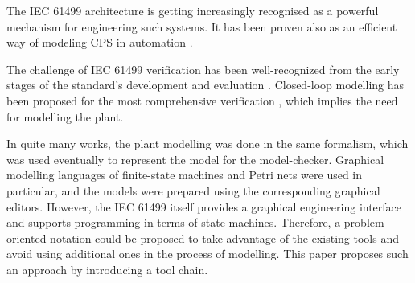 \documentclass[conference]{IEEEtran}
\begin{document}
The {IEC 61499} architecture \cite{iec61499part12012} is getting increasingly recognised as a powerful mechanism for engineering such systems. 
It has been proven also as an efficient way of modeling CPS in automation \cite{dai2017discrete}. 

The challenge of IEC 61499 verification has been well-recognized from the early stages of the standard's development and evaluation \cite{vyatkin1999modeling}. Closed-loop modelling has been proposed for the most comprehensive verification \cite{vyatkin2008closed}, which implies the need for modelling the plant. 

In quite many works, the plant modelling \cite{buzhinsky2016plant} was done in the same formalism, which was used eventually to represent the model for the model-checker. Graphical modelling languages of finite-state machines and Petri nets \cite{berthomieu1991modeling} were used in particular, and the models were prepared using the corresponding graphical editors.
However, the IEC 61499 itself provides a graphical engineering interface and supports programming in terms of state machines. Therefore, a problem-oriented notation could be proposed to take advantage of the existing tools and avoid using additional ones in the process of modelling. This paper proposes such an approach by introducing a tool chain.


\end{document}
